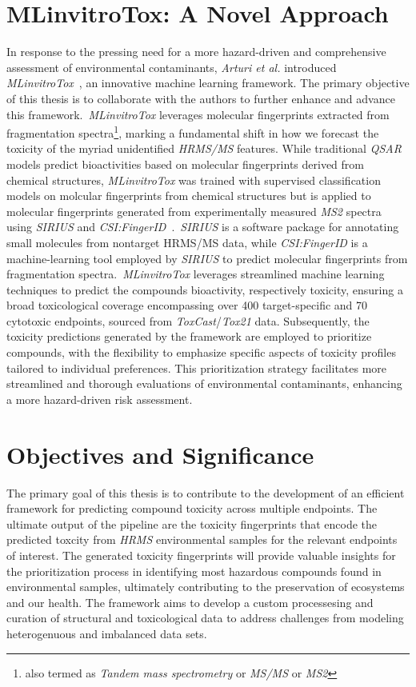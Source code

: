 \section{MLinvitroTox: A Novel Approach}

In response to the pressing need for a more hazard-driven and comprehensive assessment of environmental contaminants, \emph{Arturi et al.} introduced \emph{MLinvitroTox}~\cite{arturi}, an innovative machine learning framework.
 The primary objective of this thesis is to collaborate with the authors to further enhance and advance this framework.~\emph{MLinvitroTox} leverages molecular fingerprints extracted from fragmentation spectra\footnote{also termed as \emph{Tandem mass spectrometry} or \emph{MS/MS} or \emph{MS2}}, marking a fundamental shift in how we forecast the toxicity of the myriad unidentified \emph{HRMS/MS} features. While traditional \emph{QSAR} models predict bioactivities based on molecular fingerprints derived from chemical structures, \emph{MLinvitroTox} was trained with supervised classification models on molcular fingerprints from chemical structures but is applied to molecular fingerprints generated from experimentally measured \emph{MS2} spectra using \emph{SIRIUS} and \emph{CSI:FingerID}~\cite{sirius2019}.~\emph{SIRIUS} is a software package for annotating small molecules from nontarget HRMS/MS data, while \emph{CSI:FingerID} is a machine-learning tool employed by \emph{SIRIUS} to predict molecular fingerprints from fragmentation spectra.~\emph{MLinvitroTox} leverages streamlined machine learning techniques to predict the compounds bioactivity, respectively toxicity, ensuring a broad toxicological coverage encompassing over 400 target-specific and 70 cytotoxic endpoints, sourced from \emph{ToxCast}/\emph{Tox21} data. Subsequently, the toxicity predictions generated by the framework are employed to prioritize compounds, with the flexibility to emphasize specific aspects of toxicity profiles tailored to individual preferences. This prioritization strategy facilitates more streamlined and thorough evaluations of environmental contaminants, enhancing a more hazard-driven risk assessment.


\section{Objectives and Significance}

The primary goal of this thesis is to contribute to the development of an efficient framework for predicting compound toxicity across multiple endpoints. The ultimate output of the pipeline are the toxicity fingerprints that encode the predicted toxcity from \emph{HRMS} environmental samples for the relevant endpoints of interest. The generated toxicity fingerprints will provide valuable insights for the prioritization process in identifying most hazardous compounds found in environmental samples, ultimately contributing to the preservation of ecosystems and our health. The framework aims to develop a custom processesing and curation of structural and toxicological data to address challenges from modeling heterogenuous and imbalanced data sets.

